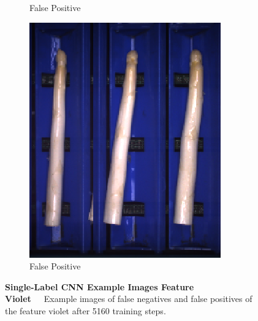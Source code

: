 \begin{figure}[!htb]
\begin{subfigure}{0.3\textwidth}
		\vspace{-5pt}
		\caption{False Positive}
	\end{subfigure}
	\begin{subfigure}{0.3\textwidth}
		\includegraphics[width=0.9\linewidth]{Figures/appendix/violet_falsepositive_03.png}
		\vspace{-5pt}
		\caption{False Positive}
	\end{subfigure}
	\vspace{-5pt}
    \caption[Single-Label CNN Example Images Feature Violet]{\textbf{Single-Label CNN Example Images Feature Violet}~~~Example images of false negatives and false positives of the feature violet after 5160 training steps.}
    \label{fig:ExampleImagesViolet}
\end{figure}


